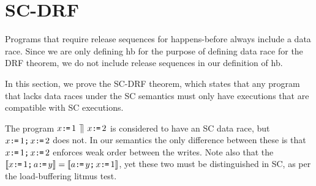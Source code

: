 \section{SC-DRF}


Programs that require release sequences for happens-before always include a
data race.  Since we are only defining hb for the purpose of defining data
race for the DRF theorem, we do not include release sequences in our
definition of hb.

In this section, we prove the SC-DRF theorem, which states that any program
that lacks data races under the SC semantics must only have executions that
are compatible with SC executions.

The program $x\texttt{:}\mkern-1mu\texttt{=}\,1\,\mathbin{\rrceil}\, x\texttt{:}\mkern-1mu\texttt{=}\,2$ is considered to have an SC data race, but
$x\texttt{:}\mkern-1mu\texttt{=}\,1\texttt{;}\, x\texttt{:}\mkern-1mu\texttt{=}\,2$ does not.  In our semantics the only difference
between these is that $x\texttt{:}\mkern-1mu\texttt{=}\,1\texttt{;}\, x\texttt{:}\mkern-1mu\texttt{=}\,2$ enforces weak order between the
writes.  Note also that the
$\llbracket x\texttt{:}\mkern-1mu\texttt{=}\,1\texttt{;}\, a\texttt{:}\mkern-1mu\texttt{=}\, y\rrbracket=\llbracket a\texttt{:}\mkern-1mu\texttt{=}\, y\texttt{;}\, x\texttt{:}\mkern-1mu\texttt{=}\,1\rrbracket$, yet these two must
be distinguished in SC, as per the load-buffering litmus test.

